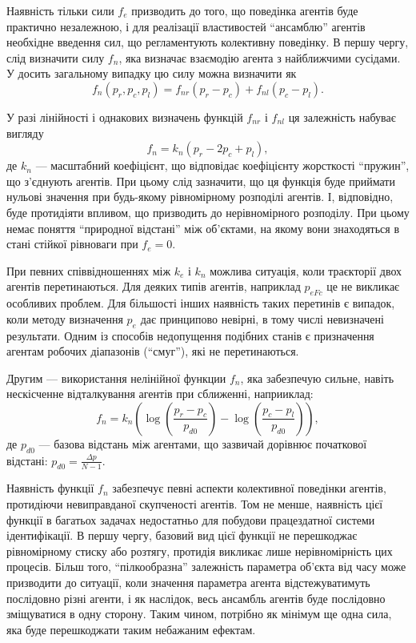 Наявність тільки сили $f_e$ призводить до того, що поведінка агентів буде
практично незалежною, і для реалізації властивостей ``ансамблю'' агентів
необхідне введення сил, що регламентують колективну поведінку. В першу чергу,
слід визначити силу $f_n$, яка визначає взаємодію агента з найближчими
сусідами. У досить загальному випадку цю силу можна визначити як
%
\begin{equation}
  f_n( p_r, p_c, p_l ) = f_{nr}(p_r-p_c) + f_{nl}(p_c-p_l).
  \label{atu:eq:f_n_gen}
\end{equation}

У разі лінійності і однакових визначень функцій $f_{nr}$ і $f_{nl}$ ця залежність набуває вигляду
%
\begin{equation}
  f_n = k_n ( p_r - 2 p_c + p_l ),
  \label{atu:eq:f_n_lin}
\end{equation}
%
де $k_n$ --- масштабний коефіцієнт, що відповідає коефіцієнту жорсткості
``пружин'', що з'єднують агентів. При цьому слід зазначити, що ця функція буде
приймати нульові значення при будь-якому рівномірному розподілі агентів.
І, відповідно, буде протидіяти впливом, що призводить до
нерівномірного розподілу. При цьому немає поняття ``природної відстані''
між об'єктами, на якому вони знаходяться в стані стійкої рівноваги при
$ f_e = 0 $.

При певних співвідношеннях між
$ k_e $ і
$ k_n $ можлива ситуація, коли траєкторії двох агентів
перетинаються. Для деяких типів агентів, наприклад
$ p_{eFc} $ це не викликає особливих проблем. Для більшості інших
наявність таких перетинів є випадок, коли методу визначення
$ p_e $ дає принципово невірні, в тому числі невизначені
результати. Одним із способів недопущення подібних станів є
призначення агентам робочих діапазонів (``смуг''), які не перетинаються.

Другим --- використання нелінійної функции $f_n$,
яка забезпечую сильне, навіть нескісченне відталкування
агентів при сближенні, наприиклад:
%
\begin{equation}
  f_n = k_n \left( \log\left( \frac{p_r-p_c}{p_{d0}} \right) -  \log\left( \frac{p_c-p_l}{p_{d0}}\right) \right),
  \label{atu:eq:f_n_log}
\end{equation}
%
де
$p_{d0}$ ---
базова відстань між агентами, що зазвичай дорівнює початкової відстані:
$p_{d0} = \frac{\Delta p}{N-1}$.




Наявність функції
$ f_n $ забезпечує певні аспекти колективної поведінки агентів,
протидіючи невиправданої скупченості агентів. Том не менше,
наявність цієї функції в багатьох задачах недостатньо для
побудови працездатної системи ідентифікації. В першу чергу,
базовий вид цієї функції не перешкоджає рівномірному стиску
або розтягу, протидія викликає лише нерівномірність цих
процесів. Більш того, ``пілкообразна'' залежність параметра
об'єкта від часу може призводити до ситуації, коли значення
параметра агента відстежуватимуть послідовно різні агенти, і
як наслідок, весь ансамбль агентів буде послідовно зміщуватися
в одну сторону. Таким чином, потрібно як мінімум ще одна сила,
яка буде перешкоджати таким небажаним ефектам.

